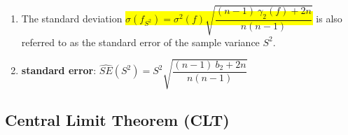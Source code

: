 \begin{enumerate}
    \item The standard deviation
    \colorbox{yellow}{$\sigma ( f _{S^2} ) = \sigma ^2( f )\sqrt{\dfrac{(n - 1)\ \gamma_2( f ) + 2n}{n(n - 1)}}$}
    is also referred to as the standard error of the sample variance $S^2$.
    \hfill \cite{statistics/book/Statistics-for-Data-Scientists/Maurits-Kaptein}

    \item \textbf{standard error}:
    $\hat{SE}(S^2) = S^2\sqrt{\dfrac{(n - 1)\ b_2 + 2n}{n(n - 1)}}$
    \hfill \cite{statistics/book/Statistics-for-Data-Scientists/Maurits-Kaptein}
\end{enumerate}


\subsection{Central Limit Theorem (CLT)}

